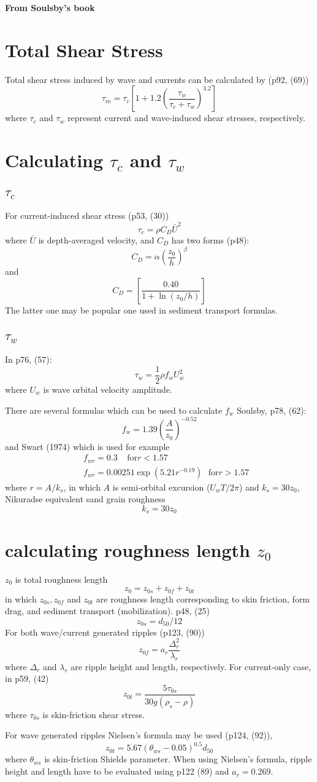 \documentclass[11pt]{article}
\newcommand{\be}{\begin{equation}}
\newcommand{\ee}{\end{equation}}
\newcommand{\ba}{\begin{eqnarray}}
\newcommand{\ea}{\end{eqnarray}}
\begin{document}
{\bf From Soulsby's book}

\section{Total Shear Stress}
Total shear stress induced by wave and currents can be calculated by (p92, (69))
\be
\tau_m = \tau_c \left[ 1+1.2\left(\frac{\tau_w}{\tau_c+\tau_w} \right)^{3.2} \right]
\ee
where $\tau_c$ and $\tau_w$ represent current and wave-induced shear stresses, respectively. 

\section{Calculating $\tau_c$ and $\tau_w$}

\subsection {$\tau_c$}
For current-induced shear stress (p53, (30))
\be
\tau_c = \rho C_D \bar{U}^2
\ee
where $\bar{U}$ is depth-averaged velocity, and $C_D$ has two forms (p48):
\be
C_D=\alpha \left( \frac{z_0}{h} \right)^\beta
\ee 
and
\be
C_D = \left[ \frac{0.40}{1+\ln(z_0/h)}  \right]
\ee
The latter one may be popular one used in sediment transport formulas.  

\subsection{$\tau_w$}

In p76, (57):
\be
\tau_w = \frac{1}{2} \rho f_w U_w^2
\ee
where $U_w$ is wave orbital velocity amplitude.

There are several formulas which can be used to calculate $f_w$
Soulsby, p78, (62):
\be
f_{w} = 1.39 \left( \frac{A}{z_0} \right)^{-0.52}
\ee
and Swart (1974) which is used for example
\ba
&& f_{wr} =0.3  \ \ \ \ \  \mbox{for} r<1.57 \\
&& f_{wr}=0.00251 \exp(5.21r^{-0.19})  \ \ \ \mbox{for} r>1.57
\ea
where $r = A/k_s$, in which $A$ is semi-orbital excursion ($U_wT/2\pi$) and $k_s = 30z_0$, Nikuradse equivalent sand grain roughness
\be
k_s =30 z_0 
\ee

 
\section{calculating roughness length $z_0$}

 $z_0$ is total roughness length
 \be
 z_0=z_{0s} + z_{0f} + z_{0t}
 \ee    
in which $z_{0s},  z_{0f}$ and  $z_{0t}$ are roughness length corresponding to skin friction, form drag, and sediment transport (mobilization). 
p48, (25)
\be
z_{0s} = d_{50}/12
\ee
For both wave/current generated ripples (p123, (90))
\be
z_{0f} = a_r \frac{\Delta_r^2}{\lambda_r}
\ee
where $\Delta_r$ and $\lambda_r$ are ripple height and length, respectively. 
For current-only case, in p59, (42)
\be
z_{0t} = \frac{5 \tau_{0s}}{30 g (\rho_s -\rho)}
\ee
where $\tau_{0s}$ is skin-friction shear stress. 

For wave generated ripples
Nielsen's formula may be used (p124, (92)), 
\be
z_{0t} = 5.67 (\theta_{ws} - 0.05)^{0.5} d_{50}
\ee
where $\theta_{ws}$ is skin-friction Shields parameter. When using Nielsen's formula, ripple height and length have to be evaluated using p122 (89)
and $a_r=0.269$. 
\end{document}
